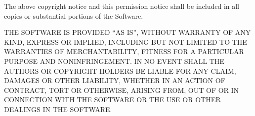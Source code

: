 \documentclass[letterpaper,10pt,english]{sphinxmanual}
\begin{document}
The above copyright notice and this permission notice shall be included in
all copies or substantial portions of the Software.

THE SOFTWARE IS PROVIDED ``AS IS'', WITHOUT WARRANTY OF ANY KIND, EXPRESS OR
IMPLIED, INCLUDING BUT NOT LIMITED TO THE WARRANTIES OF MERCHANTABILITY,
FITNESS FOR A PARTICULAR PURPOSE AND NONINFRINGEMENT. IN NO EVENT SHALL THE
AUTHORS OR COPYRIGHT HOLDERS BE LIABLE FOR ANY CLAIM, DAMAGES OR OTHER
LIABILITY, WHETHER IN AN ACTION OF CONTRACT, TORT OR OTHERWISE, ARISING FROM,
OUT OF OR IN CONNECTION WITH THE SOFTWARE OR THE USE OR OTHER DEALINGS IN
THE SOFTWARE.



\renewcommand{\indexname}{Index}
\printindex
\end{document}
